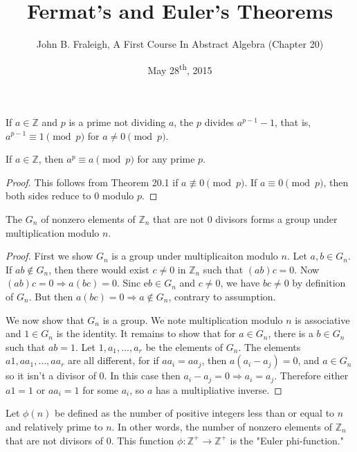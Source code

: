 \documentclass[a4paper,11pt]{article}
\title{Fermat's and Euler's Theorems}
\author{John B. Fraleigh, A First Course In Abstract Algebra (Chapter 20)}
\date{May 28\textsuperscript{th}, 2015}
\begin{document}
\maketitle
{}

\begin{outline}

    If \(a \in \mathbb{Z}\) and \(p\) is a prime not dividing \(a\),
    the \(p\) divides \(a^{p-1}-1\), that is, \(a^{p-1} \equiv 1 \pmod{p}\) for \(a \neq 0 \pmod{p}\).
      
    If \(a \in \mathbb{Z}\), then \(a^p \equiv a \pmod{p}\) for any prime \(p\).
    
    \begin{proof}
      This follows from Theorem 20.1 if \(a \not\equiv 0 \pmod{p}\). If \(a \equiv 0 \pmod{p}\), then
      both sides reduce to \(0\) modulo \(p\).
    \end{proof}
    
    The \(G_n\) of nonzero elements of \(\mathbb{Z}_n\) that are not \(0\) divisors forms a group
    under multiplication modulo \(n\).
    
    \begin{proof}
      First we show \(G_n\) is a group under multiplicaiton modulo \(n\). Let \(a, b \in G_n\). If \(ab \not\in G_n\),
      then there would exist \(c \neq 0\) in \(\mathbb{Z}_n\) such that \((ab)c = 0\). Now \((ab)c = 0 \Rightarrow a(bc)
      = 0\). Sinc e\(b \in G_n\) and \(c \neq 0\), we have \(bc \neq 0\) by definition of \(G_n\). But then \(a(bc) = 0
      \Rightarrow a \not\in G_n\), contrary to assumption.
      
      We now show that \(G_n\) is a group. We note multiplication modulo \(n\) is associative and \(1 \in G_n\) is the
      identity. It remains to show that for \(a \in G_n\), there is a \(b \in G_n\) such that \(ab = 1\). Let \(1, a_1,
      \ldots, a_r\) be the elements of \(G_n\). The elements \(a1, aa_1, \ldots, aa_r\) are all different, for if \(aa_i
      = aa_j\), then \(a(a_i-a_j) = 0\), and \(a \in G_n\) so it isn't a divisor of \(0\). In this case then \(a_i-a_j = 0
      \Rightarrow a_i = a_j\). Therefore either \(a1 = 1\) or \(aa_i = 1\) for some \(a_i\), so \(a\) has a multipliative
      inverse.
    \end{proof}
      
    Let \(\phi(n)\) be defined as the number of positive integers less than or equal to \(n\) and relatively prime 
    to \(n\). In other words, the number of nonzero elements of \(\mathbb{Z}_n\) that are not divisors 
    of \(0\). This function \(\phi: \mathbb{Z}^{+} \rightarrow \mathbb{Z}^{+}\) is the "Euler phi-function."


\end{outline}
\end{document}
